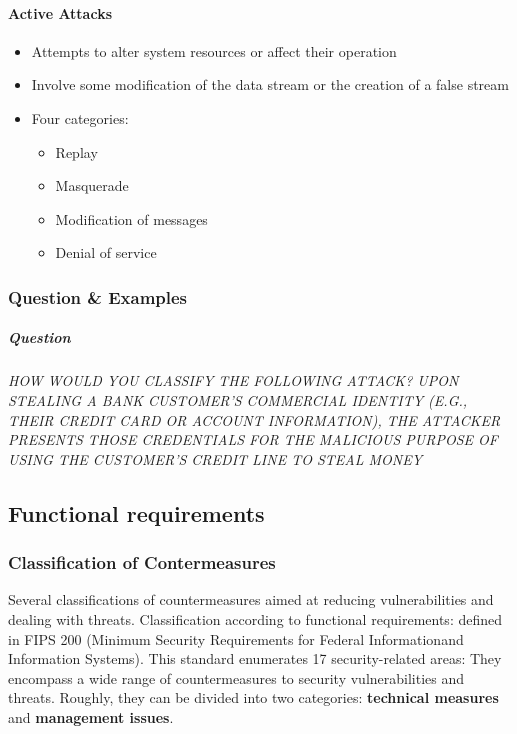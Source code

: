 \documentclass{article}
\begin{document}
                    \paragraph{Active Attacks}
                        \begin{itemize}
                            \item Attempts to alter system resources or affect their operation
                            \item Involve some modification of the data stream or the creation of a false stream
                            \item Four categories:
                            \begin{itemize}
                                \item Replay
                                \item Masquerade
                                \item Modification of messages
                                \item Denial of service
                            \end{itemize}
                        \end{itemize}
            \subsubsection{Question \& Examples}
                    \subparagraph{Question} \textit{HOW WOULD YOU CLASSIFY THE FOLLOWING ATTACK?
                    UPON STEALING A BANK CUSTOMER'S COMMERCIAL IDENTITY (E.G., THEIR
                    CREDIT CARD OR ACCOUNT INFORMATION), THE ATTACKER PRESENTS
                    THOSE CREDENTIALS FOR THE MALICIOUS PURPOSE OF USING THE
                    CUSTOMER'S CREDIT LINE TO STEAL MONEY}
        \newpage
        \subsection{Functional requirements}
                \subsubsection{Classification of Contermeasures}
                Several classifications of countermeasures aimed at reducing vulnerabilities and dealing with threats. Classification according to functional requirements:      
                defined in FIPS 200 (Minimum Security Requirements for Federal Informationand Information Systems). 
                This standard enumerates 17 security-related areas: They encompass a wide range of countermeasures to security vulnerabilities and threats. Roughly, they can be divided into two categories: \textbf{technical measures} and \textbf{management issues}.
\end{document}
